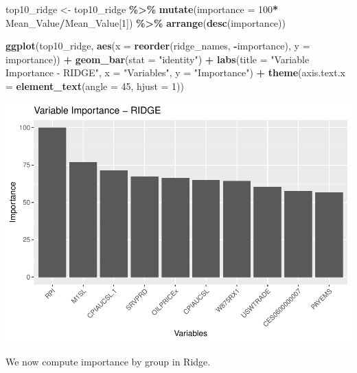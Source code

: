\documentclass[
]{article}
\newenvironment{Shaded}{\begin{snugshade}}{\end{snugshade}}
\newcommand{\AttributeTok}[1]{\textcolor[rgb]{0.13,0.29,0.53}{#1}}
\newcommand{\DecValTok}[1]{\textcolor[rgb]{0.00,0.00,0.81}{#1}}
\newcommand{\FunctionTok}[1]{\textcolor[rgb]{0.13,0.29,0.53}{\textbf{#1}}}
\newcommand{\NormalTok}[1]{#1}
\newcommand{\OtherTok}[1]{\textcolor[rgb]{0.56,0.35,0.01}{#1}}
\newcommand{\SpecialCharTok}[1]{\textcolor[rgb]{0.81,0.36,0.00}{\textbf{#1}}}
\newcommand{\StringTok}[1]{\textcolor[rgb]{0.31,0.60,0.02}{#1}}
\begin{document}
\begin{Shaded}
\begin{Highlighting}[]
\NormalTok{top10\_ridge }\OtherTok{\textless{}{-}}\NormalTok{ top10\_ridge }\SpecialCharTok{\%\textgreater{}\%} \FunctionTok{mutate}\NormalTok{(}\AttributeTok{importance =} \DecValTok{100}\SpecialCharTok{*}\NormalTok{ Mean\_Value}\SpecialCharTok{/}\NormalTok{Mean\_Value[}\DecValTok{1}\NormalTok{]) }\SpecialCharTok{\%\textgreater{}\%} \FunctionTok{arrange}\NormalTok{(}\FunctionTok{desc}\NormalTok{(importance))}

\FunctionTok{ggplot}\NormalTok{(top10\_ridge, }\FunctionTok{aes}\NormalTok{(}\AttributeTok{x =} \FunctionTok{reorder}\NormalTok{(ridge\_names, }\SpecialCharTok{{-}}\NormalTok{importance), }\AttributeTok{y =}\NormalTok{ importance)) }\SpecialCharTok{+}
  \FunctionTok{geom\_bar}\NormalTok{(}\AttributeTok{stat =} \StringTok{"identity"}\NormalTok{) }\SpecialCharTok{+}
  \FunctionTok{labs}\NormalTok{(}\AttributeTok{title =} \StringTok{"Variable Importance {-} RIDGE"}\NormalTok{,}
       \AttributeTok{x =} \StringTok{"Variables"}\NormalTok{,}
       \AttributeTok{y =} \StringTok{"Importance"}\NormalTok{) }\SpecialCharTok{+}
  \FunctionTok{theme}\NormalTok{(}\AttributeTok{axis.text.x =} \FunctionTok{element\_text}\NormalTok{(}\AttributeTok{angle =} \DecValTok{45}\NormalTok{, }\AttributeTok{hjust =} \DecValTok{1}\NormalTok{))}
\end{Highlighting}
\end{Shaded}

\includegraphics{Trabalho_Econo4_Q2_files/figure-latex/unnamed-chunk-29-1.pdf}

We now compute importance by group in Ridge.
\end{document}
